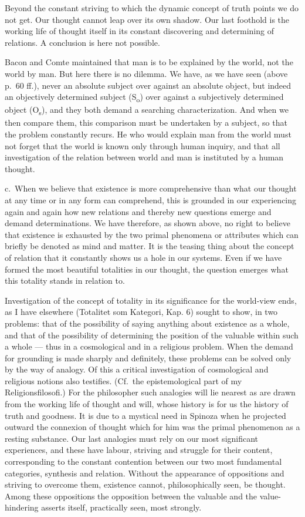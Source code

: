 \documentclass[12pt]{article}
\newcommand{\opage}[1]{\marginnote{\footnotesize\textit{[#1]}}}
\begin{document}
Beyond the constant striving to which the dynamic concept of truth points we
do not get. Our thought cannot leap over its own shadow. Our last foothold
is the working life of thought itself in its constant discovering and
determining of relations. A conclusion is here not possible.

Bacon and Comte maintained that man is to be explained by the world, not the
world by man. But here there is no dilemma. We have, as we have seen (above
p.~60 ff.), never an absolute subject over against an absolute object, but
indeed an objectively determined subject (S\textsubscript{o}) over against a
subjectively determined object (O\textsubscript{s}), and they both demand a
searching characterization. And when we then compare them, this comparison
must be undertaken by a subject, so that the problem constantly recurs. He
who would explain man from the world must not forget that the world is known
only through human inquiry, and that all investigation of the relation
between world and man is instituted by a human thought.

c.~When we believe that existence is more comprehensive than what our
thought at any time or in any form can comprehend, this is grounded in our
experiencing again and again how new relations and thereby new questions
emerge and demand determinations. We have \opage{106}therefore, as shown above, no
right to believe that existence is exhausted by the two primal phenomena or
attributes which can briefly be denoted as mind and matter. It is the
teasing thing about the concept of relation that it constantly shows us a
hole in our systems. Even if we have formed the most beautiful totalities in
our thought, the question emerges what this totality stands in relation to.

Investigation of the concept of totality in its significance for the
world-view ends, as I have elsewhere (Totalitet som Kategori, Kap. 6) sought
to show, in two problems: that of the possibility of saying anything about
existence as a whole, and that of the possibility of determining the
position of the valuable within such a whole --- thus in a cosmological and
in a religious problem. When the demand for grounding is made sharply and
definitely, these problems can be solved only by the way of analogy. Of this
a critical investigation of cosmological and religious notions also
testifies. (Cf.\ the epistemological part of my Religionsfilosofi.) For the
philosopher such analogies will lie nearest as are drawn from the working
life of thought and will, whose history is for us the history of truth and
goodness. It is due to a mystical need in Spinoza when he projected outward
the connexion of thought which for him was the primal phenomenon as a
resting substance. Our last analogies must rely on our most significant
experiences, and these have labour, striving and struggle for their content,
corresponding to the constant contention between our two most fundamental
categories, synthesis and relation. Without the appearance of oppositions
and striving to overcome them, existence cannot, philosophically seen, be
thought. Among these oppositions the opposition between the valuable and the
value-hindering asserts itself, practically seen, most strongly.
\end{document}
